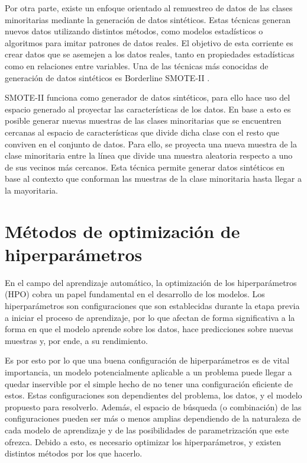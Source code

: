 \documentclass{uathesis-es}
\begin{document}
Por otra parte, existe un enfoque orientado al remuestreo de datos de las clases minoritarias mediante la generación de datos sintéticos. Estas técnicas generan nuevos datos utilizando distintos métodos, como modelos estadísticos o algoritmos para imitar patrones de datos reales. El objetivo de esta corriente es crear datos que se asemejen a los datos reales, tanto en propiedades estadísticas como en relaciones entre variables. Una de las técnicas más conocidas de generación de datos sintéticos es Borderline SMOTE-II \cite{han2005borderline}.

SMOTE-II funciona como generador de datos sintéticos, para ello hace uso del espacio generado al proyectar las características de los datos. En base a esto es posible generar nuevas muestras de las clases minoritarias que se encuentren cercanas al espacio de características que divide dicha clase con el resto que conviven en el conjunto de datos. Para ello, se proyecta una nueva muestra de la clase minoritaria entre la línea que divide una muestra aleatoria respecto a uno de sus vecinos más cercanos. Esta técnica permite generar datos sintéticos en base al contexto que conforman las muestras de la clase minoritaria hasta llegar a la mayoritaria.

\section{Métodos de optimización de hiperparámetros}
\label{HYPERPARAMETERS_OPTIMIZATION_METHODS}

En el campo del aprendizaje automático, la optimización de los hiperparámetros (HPO) cobra un papel fundamental en el desarrollo de los modelos. Los hiperparámetros son configuraciones que son establecidas durante la etapa previa a iniciar el proceso de aprendizaje, por lo que afectan de forma significativa a la forma en que el modelo aprende sobre los datos, hace predicciones sobre nuevas muestras y, por ende, a su rendimiento.

Es por esto por lo que una buena configuración de hiperparámetros es de vital importancia, un modelo potencialmente aplicable a un problema puede llegar a quedar inservible por el simple hecho de no tener una configuración eficiente de estos. Estas configuraciones son dependientes del problema, los datos, y el modelo propuesto para resolverlo. Además, el espacio de búsqueda (o combinación) de las configuraciones pueden ser más o menos amplias dependiendo de la naturaleza de cada modelo de aprendizaje y de las posibilidades de parametrización que este ofrezca. Debido a esto, es necesario optimizar los hiperparámetros, y existen distintos métodos por los que hacerlo.
\end{document}
